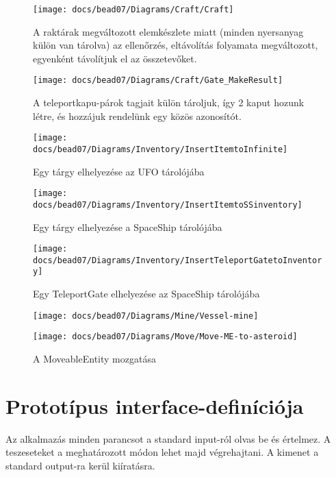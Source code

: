 \documentclass[../../projlab]{subfiles}
\begin{document}
\begin{figure}[H] 
    \centering 
    \texttt{[image: docs/bead07/Diagrams/Craft/Craft]} 
    \caption{A raktárak megváltozott elemkészlete miatt (minden nyersanyag külön van tárolva) az ellenőrzés, eltávolítás folyamata megváltozott, egyenként távolítjuk el az összetevőket. } 
\end{figure} 

\begin{figure}[H] 
    \centering 
    \texttt{[image: docs/bead07/Diagrams/Craft/Gate\_MakeResult]} 
    \caption{A teleportkapu-párok tagjait külön tároljuk, így 2 kaput hozunk létre, és hozzájuk rendelünk egy közös azonosítót.} 
\end{figure} 

\begin{figure}[H] 
    \centering 
    \texttt{[image: docs/bead07/Diagrams/Inventory/InsertItemtoInfinite]} 
    \caption{Egy tárgy elhelyezése az UFO tárolójába} 
\end{figure} 

\begin{figure}[H] 
    \centering 
    \texttt{[image: docs/bead07/Diagrams/Inventory/InsertItemtoSSinventory]} 
    \caption{Egy tárgy elhelyezése a SpaceShip tárolójába} 
\end{figure} 

\begin{figure}[H] 
    \centering 
    \texttt{[image: docs/bead07/Diagrams/Inventory/InsertTeleportGatetoInventory]} 
    \caption{Egy TeleportGate elhelyezése az SpaceShip tárolójába} 
\end{figure}

\begin{figure}[H] 
    \centering 
    \texttt{[image: docs/bead07/Diagrams/Mine/Vessel-mine]} 
    \caption{} 
\end{figure} 

\begin{figure}[H] 
    \centering 
    \texttt{[image: docs/bead07/Diagrams/Move/Move-ME-to-asteroid]} 
    \caption{A MoveableEntity mozgatása} 
\end{figure} 


\section{Prototípus interface-definíciója}
Az alkalmazás minden parancsot a standard input-ról olvas be és értelmez. A teszeseteket a meghatározott módon lehet majd végrehajtani.
A kimenet a standard output-ra kerül kiíratásra.
\end{document}
